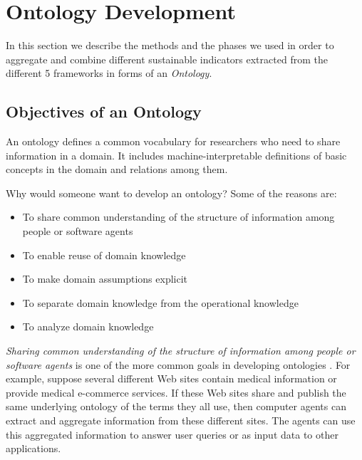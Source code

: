 \documentclass[preprint,12pt]{elsarticle}
\begin{document}

    





\section{Ontology Development}
In this section we describe the methods and the phases we used in order to aggregate and combine different sustainable indicators extracted from the different 5 frameworks in forms of an \emph{Ontology}.

\subsection{Objectives of an Ontology}
An ontology defines a common vocabulary for researchers who need to share information in a domain. It includes machine-interpretable definitions of basic concepts in the domain and relations among them.

Why would someone want to develop an ontology? Some of the reasons are:
\begin{itemize}
\item To share common understanding of the structure of information among people or software agents
\item To enable reuse of domain knowledge
\item To make domain assumptions explicit
\item To separate domain knowledge from the operational knowledge
\item To analyze domain knowledge
\end{itemize}

\emph{Sharing common understanding of the structure of information among people or software agents}  is one of the more common goals in developing ontologies \cite{gruber1995toward}. For example, suppose several different Web sites contain medical information or provide medical e-commerce services. If these Web sites share and publish the same underlying ontology of the terms they all use, then computer agents can extract and aggregate information from these different sites. The agents can use this aggregated information to answer user queries or as input data to other applications.
\end{document}
